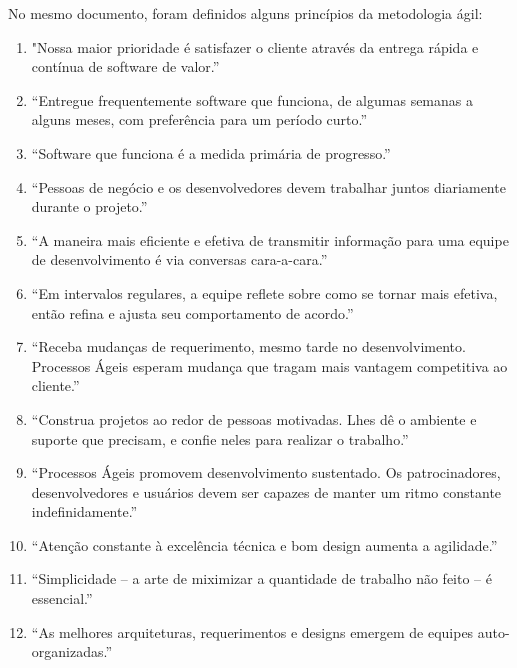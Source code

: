 \documentclass[10pt,a4paper,font=plain]{abnt}
\begin{document}
No mesmo documento, foram definidos alguns princípios da metodologia ágil:

\begin{enumerate}

\item "Nossa maior prioridade é satisfazer o cliente através da entrega rápida e contínua de software de valor.''
    
\item ``Entregue frequentemente software que funciona, de algumas semanas a alguns meses, com preferência para um período curto.''
   
\item ``Software que funciona é a medida primária de progresso.''

\item ``Pessoas de negócio e os desenvolvedores devem trabalhar juntos diariamente durante o projeto.''

\item ``A maneira mais eficiente e efetiva de transmitir informação para uma equipe de desenvolvimento é via conversas cara-a-cara.''

\item ``Em intervalos regulares, a equipe reflete sobre como se tornar mais efetiva, então refina e ajusta seu comportamento de acordo.''

\item ``Receba mudanças de requerimento, mesmo tarde no desenvolvimento. Processos Ágeis esperam mudança que tragam mais vantagem competitiva ao cliente.''

\item ``Construa projetos ao redor de pessoas motivadas. Lhes dê o ambiente e suporte que precisam, e confie neles para realizar o trabalho.''

\item ``Processos Ágeis promovem desenvolvimento sustentado. Os patrocinadores, desenvolvedores e usuários devem ser capazes de manter um ritmo constante indefinidamente.''

\item ``Atenção constante à excelência técnica e bom design aumenta a agilidade.''

\item ``Simplicidade – a arte de miximizar a quantidade de trabalho não feito – é essencial.''

\item ``As melhores arquiteturas, requerimentos e designs emergem de equipes auto-organizadas.''

\end{enumerate}
\end{document}
